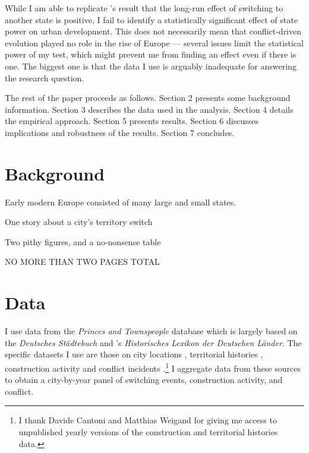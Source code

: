 \documentclass{article}
\begin{document}
While I am able to replicate \cite{schoenholzer2022}'s result that the long-run effect of switching to another state is positive, I fail to identify a statistically significant effect of state power on urban development. This does not necessarily mean that conflict-driven evolution played no role in the rise of Europe --- several issues limit the statistical power of my test, which might prevent me from finding an effect even if there is one. The biggest one is that the data I use is arguably inadequate for answering the research question.

The rest of the paper proceeds as follows. Section 2 presents some background information. Section 3 describes the data used in the analysis. Section 4 details the empirical approach. Section 5 presents results. Section 6 discusses implications and robustness of the results. Section 7 concludes.


\section{Background}

Early modern Europe consisted of many large and small states. 

One story about a city's territory switch

Two pithy figures, and a no-nonsense table

NO MORE THAN TWO PAGES TOTAL


\section{Data}

I use data from the \textit{Princes and Townspeople} database which is largely based on the \textit{Deutsches Städtebuch} \citep{keyser1939} and \cite{kobler2007}'s \textit{Historisches Lexikon der Deutschen Länder}. The specific datasets I use are those on city locations \citep{pt1}, territorial histories \citep{pt2}, construction activity \citep{pt5} and conflict incidents \citep{pt6}.\footnote{I thank Davide Cantoni and Matthias Weigand for giving me access to unpublished yearly versions of the construction and territorial histories data.} I aggregate data from these sources to obtain a city-by-year panel of switching events, construction activity, and conflict. 
\end{document}

